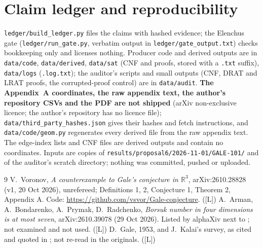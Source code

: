 \documentclass[10pt]{article}
\newcommand{\tier}[1]{\textsf{[#1]}}
\newcommand{\tL}{\tier{L}}
\begin{document}
\section{Claim ledger and reproducibility}\label{sec:ledger}
\texttt{ledger/build\_ledger.py} files the claims with hashed evidence; the Elenchus gate (\texttt{ledger/run\_gate.py}, verbatim output in \texttt{ledger/gate\_output.txt}) checks bookkeeping only and licenses nothing. Producer code and derived outputs are in \texttt{data/code}, \texttt{data/derived}, \texttt{data/sat} (CNF and proofs, stored with a \texttt{.txt} suffix), \texttt{data/logs} (\texttt{.log.txt}); the auditor's scripts and small outputs (CNF, DRAT and LRAT proofs, the corrupted-proof control) are in \texttt{data/audit}. \textbf{The Appendix~A coordinates, the raw appendix text, the author's repository CSVs and the PDF are not shipped} (arXiv non-exclusive licence; the author's repository has no licence file); \texttt{data/third\_party\_hashes.json} gives their hashes and fetch instructions, and \texttt{data/code/geom.py} regenerates every derived file from the raw appendix text. The edge-index lists and CNF files are derived outputs and contain no coordinates. Inputs are copies of \texttt{results/proposal6/2026-11-01/GALE-101/} and of the auditor's scratch directory; nothing was committed, pushed or uploaded.

\begin{thebibliography}{9}\small
{} V.\ Voronov, \emph{A counterexample to Gale's conjecture in $\mathbb{R}^3$}, arXiv:2610.28828 (v1, 20 Oct 2026), unrefereed; Definitions 1, 2, Conjecture 1, Theorem 2, Appendix A. Code: \url{https://github.com/vsvor/Gale-conjecture}. (\tL)
 A.\ Arman, A.\ Bondarenko, A.\ Prymak, D.\ Radchenko, \emph{Borsuk number in four dimensions is at most seven}, arXiv:2610.39078 (29 Oct 2026). Listed by alphaXiv next to \cite{vor}; not examined and not used. (\tL)
 D.\ Gale, 1953, and J.\ Kalai's survey, as cited and quoted in \cite{vor}; not re-read in the originals. (\tL)
\end{thebibliography}
\end{document}
